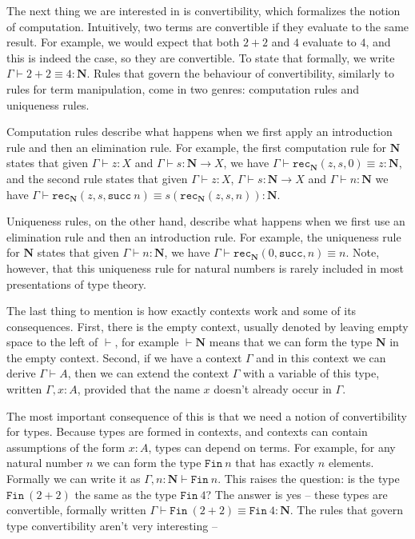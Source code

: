 \documentclass[declaration,mgr,english,shortabstract]{iithesis}
\newcommand{\m}[1]{\texttt{#1}}
\newcommand{\N}{\mathbf{N}}
\begin{document}
The next thing we are interested in is convertibility, which formalizes the notion of computation. Intuitively, two terms are convertible if they evaluate to the same result. For example, we would expect that both $2 + 2$ and $4$ evaluate to $4$, and this is indeed the case, so they are convertible. To state that formally, we write $\Gamma \vdash 2 + 2 \equiv 4 : \N$. Rules that govern the behaviour of convertibility, similarly to rules for term manipulation, come in two genres: computation rules and uniqueness rules.

Computation rules describe what happens when we first apply an introduction rule and then an elimination rule. For example, the first computation rule for $\N$ states that given $\Gamma \vdash z : X$ and $\Gamma \vdash s : \N \to X$, we have $\Gamma \vdash \m{rec}_\N(z, s, 0) \equiv z : \N$, and the second rule states that given $\Gamma \vdash z : X$, $\Gamma \vdash s : \N \to X$ and $\Gamma \vdash n : \N$ we have $\Gamma \vdash \m{rec}_\N(z, s, \m{succ}\ n) \equiv s (\m{rec}_\N(z, s, n)) : \N$.

Uniqueness rules, on the other hand, describe what happens when we first use an elimination rule and then an introduction rule. For example, the uniqueness rule for $\N$ states that given $\Gamma \vdash n : \N$, we have $\Gamma \vdash \m{rec}_\N(0, \m{succ}, n) \equiv n$. Note, however, that this uniqueness rule for natural numbers is rarely included in most presentations of type theory.

The last thing to mention is how exactly contexts work and some of its consequences. First, there is the empty context, usually denoted by leaving empty space to the left of $\vdash$, for example $\vdash \N$ means that we can form the type $\N$ in the empty context. Second, if we have a context $\Gamma$ and in this context we can derive $\Gamma \vdash A$, then we can extend the context $\Gamma$ with a variable of this type, written $\Gamma, x : A$, provided that the name $x$ doesn't already occur in $\Gamma$.

The most important consequence of this is that we need a notion of convertibility for types. Because types are formed in contexts, and contexts can contain assumptions of the form $x : A$, types can depend on terms. For example, for any natural number $n$ we can form the type $\m{Fin}\ n$ that has exactly $n$ elements. Formally we can write it as $\Gamma, n : \N \vdash \m{Fin}\ n$. This raises the question: is the type $\m{Fin}\ (2 + 2)$ the same as the type $\m{Fin}\ 4$? The answer is yes -- these types are convertible, formally written $\Gamma \vdash \m{Fin}\ (2 + 2) \equiv \m{Fin}\ 4 : \N$. The rules that govern type convertibility aren't very interesting -- 
\end{document}
